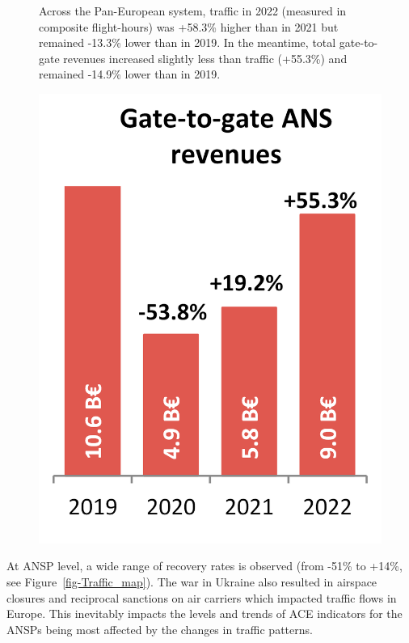 \documentclass[
  letterpaper,
  DIV=11,
  numbers=noendperiod]{scrreprt}
\begin{document}
\begin{tcolorbox}[enhanced jigsaw, leftrule=.75mm, breakable, left=2mm, colframe=quarto-callout-note-color-frame, rightrule=.15mm, colback=white, opacityback=0, arc=.35mm, toprule=.15mm, bottomrule=.15mm]
\begin{figure}[H]
\begin{minipage}{0.40\linewidth}
\justifying \noindent \hfill\break \hfill\break Across the Pan-European
system, traffic in 2022 (measured in composite flight-hours) was +58.3\%
higher than in 2021 but remained -13.3\% lower than in 2019. In the
meantime, total gate-to-gate revenues increased slightly less than
traffic (+55.3\%) and remained -14.9\% lower than in
2019.\end{minipage}%
%
\begin{minipage}{0.30\linewidth}
\includegraphics{figures/Figure-2-2-rev.png}\end{minipage}%

\end{figure}%

\end{tcolorbox}

\newpage{}

At ANSP level, a wide range of recovery rates is observed (from -51\% to
+14\%, see Figure~\ref{fig-Traffic_map}). The war in Ukraine also
resulted in airspace closures and reciprocal sanctions on air carriers
which impacted traffic flows in Europe. This inevitably impacts the
levels and trends of ACE indicators for the ANSPs being most affected by
the changes in traffic patterns.
\end{document}
